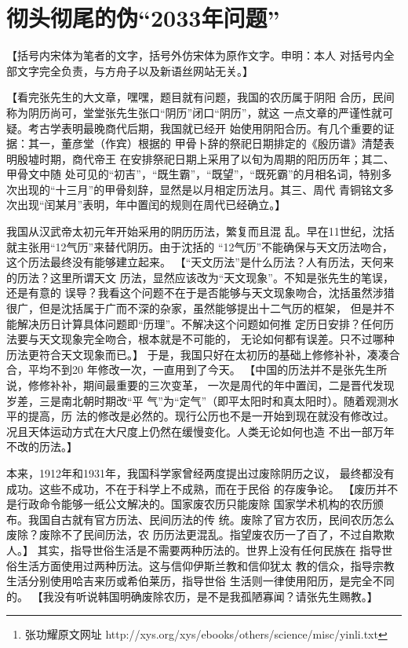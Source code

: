 \chapter{彻头彻尾的伪“2033年问题”}

\subtitle{
    ——评张功耀《由“2033年问题”而论废除阴历》\footnote{张功耀原文网址 http://xys.org/xys/ebooks/others/science/misc/yinli.txt}
}

【括号内宋体为笔者的文字，括号外仿宋体为原作文字。申明：本人
对括号内全部文字完全负责，与方舟子以及新语丝网站无关。】

【看完张先生的大文章，嘿嘿，题目就有问题，我国的农历属于阴阳
合历，民间称为阴历尚可，堂堂张先生张口“阴历”闭口“阴历”，就这
一点文章的严谨性就可疑。考古学表明最晚商代后期，我国就已经开
始使用阴阳合历。有几个重要的证据：其一，董彦堂（作宾）根据的
甲骨卜辞的祭祀日期排定的《殷历谱》清楚表明殷墟时期，商代帝王
在安排祭祀日期上采用了以旬为周期的阳历历年；其二、甲骨文中随
处可见的“初吉”，“既生霸”，“既望”，“既死霸”的月相名词，特别多
次出现的“十三月”的甲骨刻辞，显然是以月相定历法月。其三、周代
青铜铭文多次出现“闰某月”表明，年中置闰的规则在周代已经确立。】

\fangsong 我国从汉武帝太初元年开始采用的阴历历法，繁复而且混
乱。早在11世纪，沈括就主张用“12气历”来替代阴历。由于沈括的
“12气历”不能确保与天文历法吻合，这个历法最终没有能够建立起来。
\normalfont
【“天文历法”是什么历法？人有历法，天何来的历法？这里所谓天文
历法，显然应该改为“天文现象”。不知是张先生的笔误，还是有意的
误导？我看这个问题不在于是否能够与天文现象吻合，沈括虽然涉猎
很广，但是沈括属于广而不深的杂家，虽然能够提出十二气历的框架，
但是并不能解决历日计算具体问题即“历理”。不解决这个问题如何推
定历日安排？任何历法要与天文现象完全吻合，根本就是不可能的，
无论如何都有误差。只不过哪种历法更符合天文现象而已。】
\fangsong
于是，我国只好在太初历的基础上修修补补，凑凑合合，平均不到20
年修改一次，一直用到了今天。
\normalfont
【中国的历法并不是张先生所说，修修补补，期间最重要的三次变革，
一次是周代的年中置闰，二是晋代发现岁差，三是南北朝时期改“平
气”为“定气”（即平太阳时和真太阳时）。随着观测水平的提高，历
法的修改是必然的。现行公历也不是一开始到现在就没有修改过。
况且天体运动方式在大尺度上仍然在缓慢变化。人类无论如何也造
不出一部万年不改的历法。】

\fangsong
本来，1912年和1931年，我国科学家曾经两度提出过废除阴历之议，
最终都没有成功。这些不成功，不在于科学上不成熟，而在于民俗
的存废争论。
\normalfont
【废历并不是行政命令能够一纸公文解决的。国家废农历只能废除
国家学术机构的农历颁布。我国自古就有官方历法、民间历法的传
统。废除了官方农历，民间农历怎么废除？废除不了民间历法，农
历历法更混乱。指望废农历一了百了，不过自欺欺人。】
\fangsong
其实，指导世俗生活是不需要两种历法的。世界上没有任何民族在
指导世俗生活方面使用过两种历法。这与信仰伊斯兰教和信仰犹太
教的信众，指导宗教生活分别使用哈吉来历或希伯莱历，指导世俗
生活则一律使用阳历，是完全不同的。
\normalfont
【我没有听说韩国明确废除农历，是不是我孤陋寡闻？请张先生赐教。】

